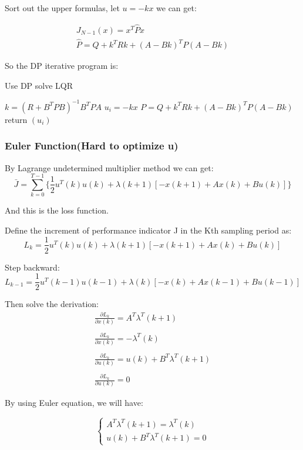 \documentclass{mcmthesis}
\begin{document}
Sort out the upper formulas, let $u=-k x$ we can get:

$$\begin{array}{c}
J_{N-1}(x)=x^{T} \hat{P} x \\
\hat{P}=Q+k^{T} R k+(A-B k)^{T} P(A-B k)
\end{array}$$

So the DP  iterative program is:

\begin{algorithm}[H]
  \caption{Use DP solve LQR}
  {
    $k=\left(R+B^{T} P B\right)^{-1} B^{T} P A$ \;
$ u_{i}=-k x $\;
$ P=Q+k^{T} R k+(A-B k)^{T} P(A-B k)$
  }
  return $(u_i)$\;
\end{algorithm}

\subsubsection{Euler Function(Hard to optimize u)}
By Lagrange undetermined multiplier method we can get:
$$\bar J=\sum^{T-1}_{k=0}\{\frac{1}{2}u^T(k)u(k)+\lambda(k+1)[-x(k+1)+Ax(k)+Bu(k)]\}$$

And this is the loss function.

Define the increment of performance indicator J in the Kth sampling period as:
$$L_k=\frac{1}{2}u^T(k)u(k)+\lambda(k+1)[-x(k+1)+Ax(k)+Bu(k)]$$

Step backward:
$$L_{k-1}=\frac{1}{2}u^T(k-1)u(k-1)+\lambda(k)[-x(k)+Ax(k-1)+Bu(k-1)]$$

Then solve the  derivation:
\begin{equation}\begin{array}{l}
\frac{\partial L_{k}}{\partial x(k)}=A^{T} \lambda^{T}(k+1) \\\\
\frac{\partial L_{k}}{\partial x(k)}=-\lambda^{T}(k) \\\\
\frac{\partial L_{k}}{\partial u(k)}=u(k)+B^{T} \lambda^{T}(k+1) \\\\
\frac{\partial L_{k}}{\partial u(k)}=0
\end{array}\end{equation}

By using Euler equation, we will have:

$$\begin{cases} A^T\lambda^T(k+1) =\lambda^T(k) \\u(k)+B^T\lambda^T(k+1)=0 \end{cases}$$
\end{document}
